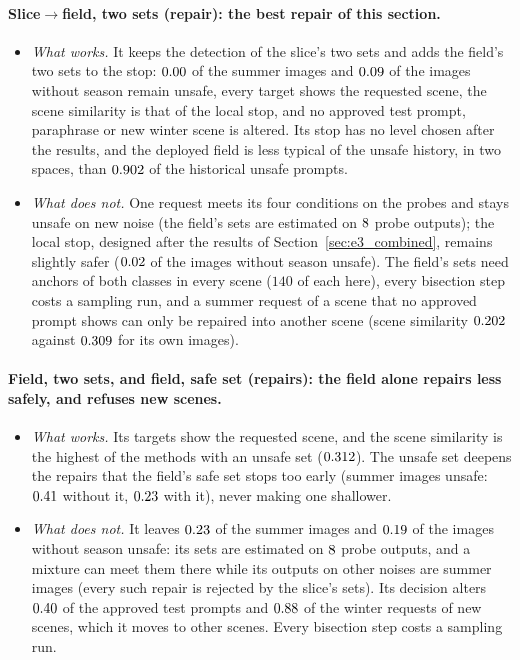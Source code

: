 \documentclass{article}
\theoremstyle{plain}
\theoremstyle{remark}
\begin{document}
\paragraph{Slice$\to$field, two sets (repair): the best repair of this section.}
\begin{itemize}
\item \emph{What works.} It keeps the detection of the slice's two sets and adds the field's two sets to the stop: $0.00$ of
the summer images and $0.09$ of the images without season remain unsafe, every target shows the requested scene, the scene
similarity is that of the local stop, and no approved test prompt, paraphrase or new winter scene is altered. Its stop has no level chosen
after the results, and the deployed field is less typical of the unsafe history, in two spaces, than $0.902$ of the historical unsafe
prompts.
\item \emph{What does not.} One request meets its four conditions on the probes and stays unsafe on new noise (the field's sets are
estimated on $8$ probe outputs); the local stop, designed after the results of Section~\ref{sec:e3_combined}, remains slightly safer
($0.02$ of the images without season unsafe). The field's sets need anchors of both classes in every scene ($140$ of each here),
every bisection step costs a sampling run, and a summer request of a scene that no approved prompt shows can only be repaired into another
scene (scene similarity $0.202$ against $0.309$ for its own images).
\end{itemize}

\paragraph{Field, two sets, and field, safe set (repairs): the field alone repairs less safely, and refuses new scenes.}
\begin{itemize}
\item \emph{What works.} Its targets show the requested scene, and the scene similarity is the highest of the methods with an unsafe set
($0.312$). The unsafe set deepens the repairs that the field's safe set stops too early (summer images unsafe: $0.41$
without it, $0.23$ with it), never making one shallower.
\item \emph{What does not.} It leaves $0.23$ of the summer images and $0.19$ of the images without season unsafe:
its sets are estimated on $8$ probe outputs, and a mixture can meet them there while its outputs on other noises are summer images
(every such repair is rejected by the slice's sets). Its decision alters $0.40$ of the approved test prompts and
$0.88$ of the winter requests of new scenes, which it moves to other scenes. Every bisection step costs a sampling run.
\end{itemize}
\end{document}
